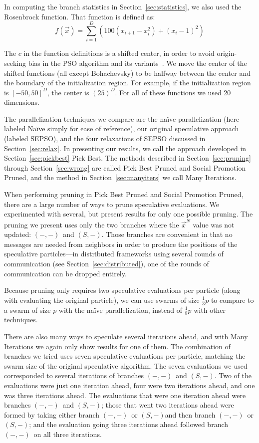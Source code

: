 \documentclass[smallcondensed]{svjour3}
\renewcommand{\sec}[1]{Section~\ref{sec:#1}}
\providecommand{\neigh}{\ensuremath{N}}
\providecommand{\nbest}{\ensuremath{\Vec{x}^\neigh}}
\providecommand{\casexn}{\ensuremath{(S,-)}}
\providecommand{\casepn}{\ensuremath{(-,-)}}
\begin{document}
In computing the branch statistics in \sec{statistics}, we also used the
Rosenbrock function.  That function is defined as:
\[f(\Vec{x}) = \sum_{i=1}^D \left(100(x_{i+1}-x_i^2)+(x_i-1)^2\right)\]

The $c$ in the function definitions is a shifted center, in order to avoid
origin-seeking bias in the PSO algorithm and its
variants~\citep{monson-2005-origin-seeking-bias}.  We move the center of the
shifted functions (all except Bohachevsky) to be halfway between the center and
the boundary of the initialization region.  For example, if the initialization
region is $[-50,50]^D$, the center is $(25)^D$.  For all of these functions we
used 20 dimensions.

The parallelization techniques we compare are the na\"ive parallelization (here
labeled Na\"ive simply for ease of reference), our original speculative
approach (labeled SEPSO), and the four relaxations of SEPSO discussed in
\sec{relax}.  In presenting our results, we call the approach developed in
\sec{pickbest} Pick Best.  The methods described in \sec{pruning} through
\sec{wrong} are called Pick Best Pruned and Social Promotion Pruned, and the
method in \sec{manyiters} we call Many Iterations.

When performing pruning in Pick Best Pruned and Social Promotion Pruned, there
are a large number of ways to prune speculative evaluations.  We experimented
with several, but present results for only one possible pruning.  The pruning
we present uses only the two branches where the $\nbest$ value was not updated:
\casepn\ and \casexn.  Those branches are convenient in that no messages are
needed from neighbors in order to produce the positions of the speculative
particles---in distributed frameworks using several rounds of communication
(see \sec{distributed}), one of the rounds of communication can be dropped
entirely.

Because pruning only requires two speculative evaluations per particle (along
with evaluating the original particle), we can use swarms of size
$\frac{1}{3}p$ to compare to a swarm of size $p$ with the na\"ive
parallelization, instead of $\frac{1}{8}p$ with other techniques.

There are also many ways to speculate several iterations ahead, and with Many
Iterations we again only show results for one of them.  The combination of
branches we tried uses seven speculative evaluations per particle, matching the
swarm size of the original speculative algorithm.  The seven evaluations we
used corresponded to several iterations of branches \casepn\ and \casexn.  Two
of the evaluations were just one iteration ahead, four were two iterations
ahead, and one was three iterations ahead.  The evaluations that were one
iteration ahead were branches \casepn\ and \casexn; those that went two
iterations ahead were formed by taking either branch \casepn\ or \casexn and
then branch \casepn\ or \casexn; and the evaluation going three iterations
ahead followed branch \casepn\ on all three iterations.
\end{document}
